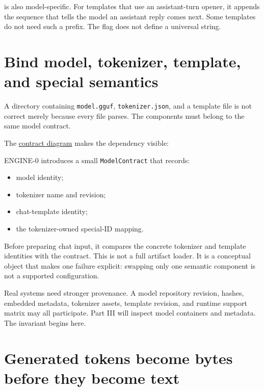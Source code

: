 \texttt{} is also model-specific. For
templates that use an assistant-turn opener, it appends the sequence
that tells the model an assistant reply comes next. Some templates do
not need such a prefix. The flag does not define a universal string.

\section{Bind model, tokenizer, template, and special
semantics}\label{bind-model-tokenizer-template-and-special-semantics}

A directory containing \texttt{model.gguf}, \texttt{tokenizer.json}, and
a template file is not correct merely because every file parses. The
components must belong to the same model contract.

The
\href{https://github.com/hermonai/inside-the-llm-engine/blob/astra-visual-rewrite/diagrams/tokenizer/model-tokenizer-template-contract.txt}{contract
diagram} makes the dependency visible:


ENGINE-0 introduces a small \texttt{ModelContract} that records:

\begin{itemize}
\tightlist
\item
  model identity;
\item
  tokenizer name and revision;
\item
  chat-template identity;
\item
  the tokenizer-owned special-ID mapping.
\end{itemize}

Before preparing chat input, it compares the concrete tokenizer and
template identities with the contract. This is not a full artifact
loader. It is a conceptual object that makes one failure explicit:
swapping only one semantic component is not a supported configuration.

Real systems need stronger provenance. A model repository revision,
hashes, embedded metadata, tokenizer assets, template revision, and
runtime support matrix may all participate. Part III will inspect model
containers and metadata. The invariant begins here.

\section{Generated tokens become bytes before they become
text}\label{generated-tokens-become-bytes-before-they-become-text}

